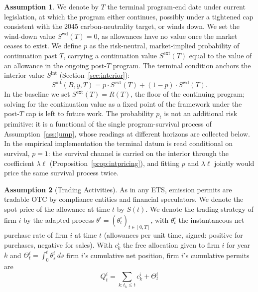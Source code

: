 \documentclass[11pt,letterpaper]{article}
\theoremstyle{plain}
\theoremstyle{definition}
\newtheorem{assumption}{Assumption}
\numberwithin{equation}{section}
\begin{document}
\begin{assumption}\label{ass:T}
We denote by $T$ the terminal program-end date under current legislation, at which the program either continues, possibly under a tightened cap consistent with the 2045 carbon-neutrality target, or winds down. We set the wind-down value $S^{\mathrm{wd}}(T)=0$, as allowances have no value once the market ceases to exist. We define $p$ as the risk-neutral, market-implied probability of continuation past $T$, carrying a continuation value $S^{\mathrm{ext}}(T)$ equal to the value of an allowance in the ongoing post-$T$ program. The terminal condition anchors the interior value $S^{\mathrm{int}}$ (Section~\ref{sec:interior}):
\begin{equation}\label{terminal}
S^{\mathrm{int}}(B,y,T)= p\cdot S^{\mathrm{ext}}(T) + (1-p)\cdot S^{\mathrm{wd}}(T).
\end{equation}
In the baseline we set $S^{\mathrm{ext}}(T)=R(T)$, the floor of the continuing program; solving for the continuation value as a fixed point of the framework under the post-$T$ cap is left to future work. The probability $p_t$ is not an additional risk primitive: it is a functional of the single program-survival process of Assumption~\ref{ass:jump}, whose readings at different horizons are collected below. In the empirical implementation the terminal datum is read conditional on survival, $p=1$: the survival channel is carried on the interior through the coefficient $\lambda\ell$ (Proposition~\ref{prop:intpricing}), and fitting $p$ and $\lambda\ell$ jointly would price the same survival process twice.
\end{assumption}


\begin{assumption}[Trading Activities]\label{ass:trading}
As in any ETS, emission permits are tradable OTC by compliance entities and financial speculators. We denote the spot price of the allowance at time $t$ by $S(t)$. We denote the trading strategy of firm $i$ by the adapted process $\theta^i=(\theta^i_t)_{t\in[0,T]}$, with $\theta_t^i$ the instantaneous net purchase rate of firm $i$ at time $t$ (allowances per unit time, signed: positive for purchases, negative for sales). With $c_k^i$ the free allocation given to firm $i$ for year $k$ and $\Theta^i_t=\int_0^t \theta_s^i\,ds$ firm $i$'s cumulative net position, firm $i$'s cumulative permits are
\begin{equation}
Q_t^i=\sum_{k:t_k\leq t} c_k^i+\Theta_t^i
\end{equation}
\end{assumption}
\end{document}
